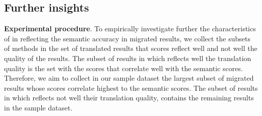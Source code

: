 \subsection{Further insights}
\textbf{Experimental procedure}. To empirically investigate further
the characteristics of {\model} in reflecting the semantic accuracy in
migrated results, we collect the subsets of methods in the set of
translated results that {\model} scores reflect well and not well the
quality of the results. The subset of results in which {\model}
reflects well the translation quality is the set with the {\model}
scores that correlate well with the semantic scores. 
%
Therefore, we aim to collect in our sample dataset the largest
subset of migrated results whose {\model} scores correlate highest to
the semantic scores. The subset of results in which {\model} reflects
not well their translation quality, contains the remaining results in
the sample dataset.


%


